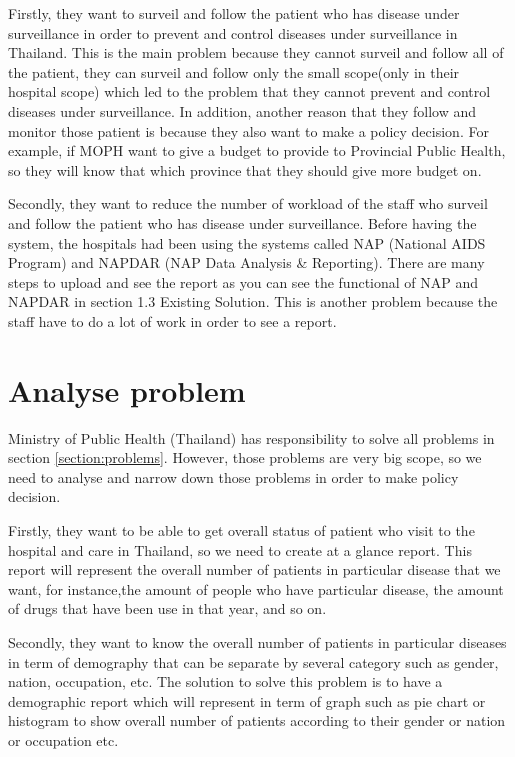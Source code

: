     Firstly, they want to surveil and follow the patient who has disease under surveillance in order to prevent and control diseases under surveillance in Thailand. This is the main problem because they cannot surveil and follow all of the patient, they can surveil and follow only the small scope(only in their hospital scope) which led to the problem that they cannot prevent and control diseases under surveillance. In addition, another reason that they follow and monitor those patient is because they also want to make a policy decision. For example, if MOPH want to give a budget to provide to Provincial Public Health, so they will know that which province that they should give more budget on.
    
    Secondly, they want to reduce the number of workload of the staff who surveil and follow the patient who has disease under surveillance. Before having the system, the hospitals had been using the systems called NAP (National AIDS Program)\cite{nap} and NAPDAR (NAP Data Analysis \& Reporting). There are many steps to upload and see the report as you can see the functional of NAP and NAPDAR in section 1.3 Existing Solution. This is another problem because the staff have to do a lot of work in order to see a report.
    
\section{Analyse problem}
    Ministry of Public Health (Thailand) has responsibility to solve all problems in section \ref{section:problems}. However, those problems are very big scope, so we need to analyse and narrow down those problems in order to make policy decision. 
    
    Firstly, they want to be able to get overall status of patient who visit to the hospital and care in Thailand, so we need to create at a glance report. This report will represent the overall number of patients in particular disease that we want, for instance,the amount of people who have particular disease, the amount of drugs that have been use in that year, and so on.
    
        
    Secondly, they want to know the overall number of patients in particular diseases in term of demography that can be separate by several category such as gender, nation, occupation, etc. The solution to solve this problem is to have a demographic report which will represent in term of graph such as pie chart or histogram to show overall number of patients according to their gender or nation or occupation etc.
    
